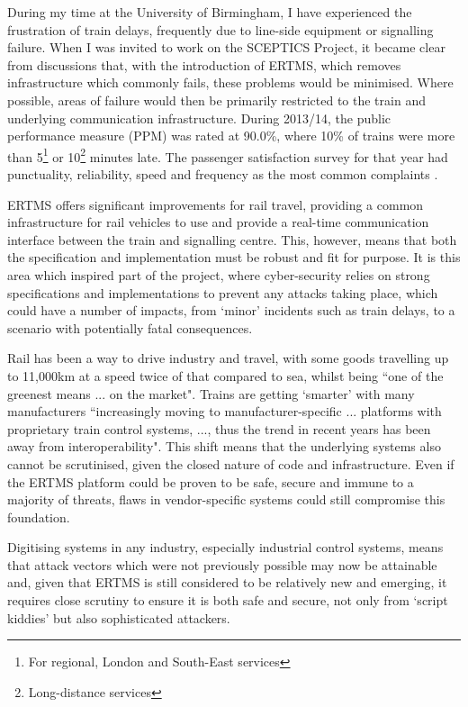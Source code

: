 \documentclass[twoside,11pt,a4paper]{article}
\begin{document}
During my time at the University of Birmingham, I have experienced the frustration of train delays, frequently due to line-side equipment or signalling failure. When I was invited to work on the SCEPTICS Project, it became clear from discussions that, with the introduction of ERTMS, which removes infrastructure which commonly fails, these problems would be minimised. Where possible, areas of failure would then be primarily restricted to the train and underlying communication infrastructure. During 2013/14, the public performance measure (PPM) was rated at 90.0\%, where 10\% of trains were more than 5\footnote{For regional, London and South-East services} or 10\footnote{Long-distance services} minutes late. The passenger satisfaction survey for that year had punctuality, reliability, speed and frequency as the most common complaints \citep[p. 3]{RailExecutive14a}.

ERTMS offers significant improvements for rail travel, providing a common infrastructure for rail vehicles to use and provide a real-time communication interface between the train and signalling centre. This, however, means that both the specification and implementation must be robust and fit for purpose. It is this area which inspired part of the project, where cyber-security relies on strong specifications and implementations to prevent any attacks taking place, which could have a number of impacts, from `minor' incidents such as train delays, to a scenario with potentially fatal consequences.

Rail has been a way to drive industry and travel, with some goods travelling up to 11,000km at a speed twice of that compared to sea, whilst being ``one of the greenest means ... on the market"\citep{EuropeanCommission13a}. Trains are getting `smarter' with many manufacturers ``increasingly moving to manufacturer-specific ... platforms with proprietary train control systems, ..., thus the trend in recent years has been away from interoperability"\citep[pp. 13]{DfT15a}. This shift means that the underlying systems also cannot be scrutinised, given the closed nature of code and infrastructure. Even if the ERTMS platform could be  proven to be safe, secure and immune to a majority of threats, flaws in vendor-specific systems could still compromise this foundation. 

Digitising systems in any industry, especially industrial control systems, means that attack vectors which were not previously possible may now be attainable and, given that ERTMS is still considered to be relatively new and emerging, it requires close scrutiny to ensure it is both safe and secure, not only from `script kiddies' but also sophisticated attackers.
\end{document}
